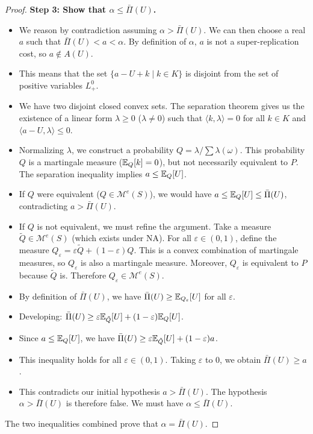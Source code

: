\begin{proof}
\textbf{Step 3: Show that $\alpha \le \bar\Pi(U)$.}
\begin{itemize}
    \item We reason by contradiction assuming $\alpha > \bar\Pi(U)$. We can then choose a real $a$ such that $\bar\Pi(U) < a < \alpha$. By definition of $\alpha$, $a$ is not a super-replication cost, so $a \notin A(U)$.
    \item This means that the set $\{a - U + k \mid k \in K\}$ is disjoint from the set of positive variables $L^0_+$.
    \item We have two disjoint closed convex sets. The separation theorem gives us the existence of a linear form $\lambda \ge 0$ ($\lambda \neq 0$) such that $\langle k, \lambda \rangle = 0$ for all $k \in K$ and $\langle a - U, \lambda \rangle \le 0$.
    \item Normalizing $\lambda$, we construct a probability $Q = \lambda / \sum \lambda(\omega)$. This probability $Q$ is a martingale measure ($\mathbb{E}_Q[k]=0$), but not necessarily equivalent to $P$. The separation inequality implies $a \le \mathbb{E}_Q[U]$.
    \item If $Q$ were equivalent ($Q \in \mathcal{M}^e(S)$), we would have $a \le \mathbb{E}_Q[U] \le \bar\Pi(U)$, contradicting $a > \bar\Pi(U)$.
    \item If $Q$ is not equivalent, we must refine the argument. Take a measure $\tilde{Q} \in \mathcal{M}^e(S)$ (which exists under NA). For all $\varepsilon \in (0, 1)$, define the measure $Q_\varepsilon = \varepsilon \tilde{Q} + (1-\varepsilon)Q$. This is a convex combination of martingale measures, so $Q_\varepsilon$ is also a martingale measure. Moreover, $Q_\varepsilon$ is equivalent to $P$ because $\tilde{Q}$ is. Therefore $Q_\varepsilon \in \mathcal{M}^e(S)$.
    \item By definition of $\bar\Pi(U)$, we have $\bar\Pi(U) \ge \mathbb{E}_{Q_\varepsilon}[U]$ for all $\varepsilon$.
    \item Developing: $\bar\Pi(U) \ge \varepsilon \mathbb{E}_{\tilde{Q}}[U] + (1-\varepsilon) \mathbb{E}_Q[U]$.
    \item Since $a \le \mathbb{E}_Q[U]$, we have $\bar\Pi(U) \ge \varepsilon \mathbb{E}_{\tilde{Q}}[U] + (1-\varepsilon)a$.
    \item This inequality holds for all $\varepsilon \in (0, 1)$. Taking $\varepsilon$ to 0, we obtain $\bar\Pi(U) \ge a$.
    \item This contradicts our initial hypothesis $a > \bar\Pi(U)$. The hypothesis $\alpha > \bar\Pi(U)$ is therefore false. We must have $\alpha \le \bar\Pi(U)$.
\end{itemize}

The two inequalities combined prove that $\alpha = \bar\Pi(U)$.
\end{proof}
